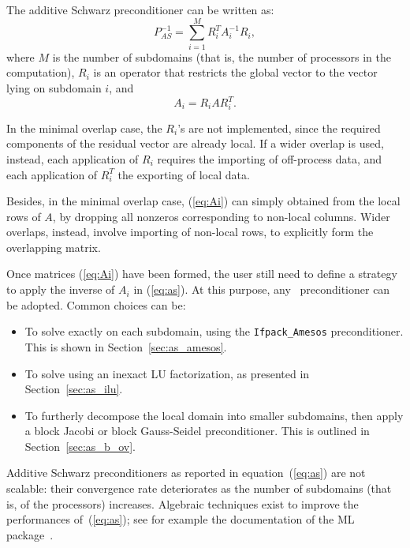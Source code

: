 The additive Schwarz preconditioner can be written as:
\begin{equation}
\label{eq:as}
P_{AS}^{-1} = \sum_{i=1}^M R_i^T A_i^{-1} R_i ,
\end{equation}
where $M$ is the number of subdomains (that is, the number of processors in
the computation), $R_i$ is an operator that restricts the global 
vector to the vector lying on subdomain $i$, and
\begin{equation}
\label{eq:Ai}
A_i = R_i A R_i^T.
\end{equation}

In the minimal overlap case, the $R_i$'s are not implemented, since the
required components of the residual vector are already local. If a wider overlap
is used, instead, each application of $R_i$ requires the importing of
off-process data, and each application of $R_i^T$ the exporting of local data.

Besides, in the minimal overlap case, (\ref{eq:Ai}) can simply obtained from
the local rows of $A$, by dropping all nonzeros corresponding to non-local
columns. Wider overlaps, instead, involve importing of non-local rows, to
explicitly form the overlapping matrix.

\smallskip

Once matrices (\ref{eq:Ai}) have been formed, the user still need to define a
strategy to apply the inverse of $A_i$ in (\ref{eq:as}). At this purpose,
any \ifpack\ preconditioner can be adopted. Common choices can be:
\begin{itemize}
\item To solve exactly on each subdomain, using the \verb!Ifpack_Amesos!
preconditioner. This is shown in Section~\ref{sec:as_amesos}.
\item To solve using an inexact LU factorization, as presented in
Section~\ref{sec:as_ilu}.
\item To furtherly decompose the local domain into smaller subdomains,
  then apply a block Jacobi or block Gauss-Seidel preconditioner. This is
  outlined in Section~\ref{sec:as_b_ov}.
\end{itemize}

\begin{remark}
Additive Schwarz preconditioners as reported in equation~(\ref{eq:as}) 
are not scalable: their convergence rate
deteriorates as the number of subdomains (that is, of the processors)
increases. Algebraic techniques
exist to improve the performances of~(\ref{eq:as}); 
see for example the documentation of the ML
package~\cite{ml-guide}.
\end{remark}

